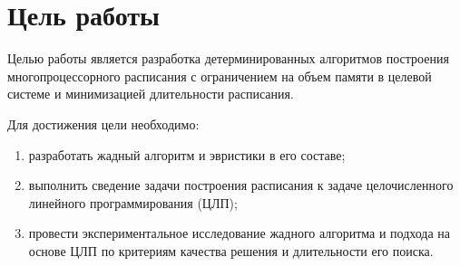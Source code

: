 \section{Цель работы}
\label{sec:1_cel_zadachi} 

\hspace{0.47cm} 

Целью работы является разработка детерминированных алгоритмов построения многопроцессорного расписания с ограничением на объем памяти в целевой системе и минимизацией длительности расписания.

Для достижения цели необходимо:
\begin{enumerate}
    \item разработать жадный алгоритм и эвристики в его составе;
    \item выполнить сведение задачи построения расписания к задаче целочисленного линейного программирования (ЦЛП);
    \item провести экспериментальное исследование жадного алгоритма и подхода на основе ЦЛП по критериям качества решения и длительности его поиска.
\end{enumerate}